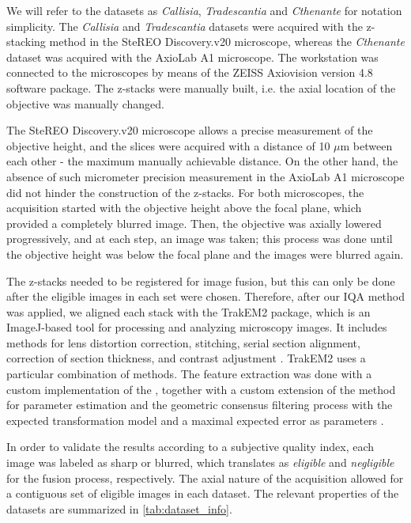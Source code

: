 We will refer to the datasets as \textit{Callisia}, \textit{Tradescantia} and \textit{Cthenante} for notation simplicity. The \textit{Callisia} and \textit{Tradescantia} datasets were acquired with the z-stacking method in the SteREO Discovery.v20 microscope, whereas the \textit{Cthenante} dataset was acquired with the AxioLab A1 microscope. The workstation was connected to the microscopes by means of the ZEISS Axiovision version 4.8 software package. The z-stacks were manually built, i.e. the axial location of the objective was manually changed.

The SteREO Discovery.v20 microscope allows a precise measurement of the objective height, and the slices were acquired with a distance of 10 $\mu$m between each other - the maximum manually achievable distance. On the other hand, the absence of such micrometer precision measurement in the AxioLab A1 microscope did not hinder the construction of the z-stacks. For both microscopes, the acquisition started with the objective height above the focal plane, which provided a completely blurred image. Then, the objective was axially lowered progressively, and at each step, an image was taken; this process was done until the objective height was below the focal plane and the images were blurred again.

The z-stacks needed to be registered for image fusion, but this can only be done after the eligible images in each set were chosen. Therefore, after our IQA method was applied, we aligned each stack with the TrakEM2 package, which is an ImageJ-based tool for processing and analyzing microscopy images. It includes methods for lens distortion correction, stitching, serial section alignment, correction of section thickness, and contrast adjustment \cite{saalfeld2019computational}. TrakEM2 uses  a particular combination of methods. The feature extraction was done with a custom implementation of the , together with a custom extension of the  method for parameter estimation and the geometric consensus filtering process with the expected transformation model and a maximal expected error as parameters \cite{saalfeld2019computational}. 

In order to validate the results according to a subjective quality index, each image was labeled as sharp or blurred, which translates as \emph{eligible} and \emph{negligible} for the fusion process, respectively. The axial nature of the acquisition allowed for a contiguous set of eligible images in each dataset. The relevant properties of the datasets are summarized in \autoref{tab:dataset_info}. 

